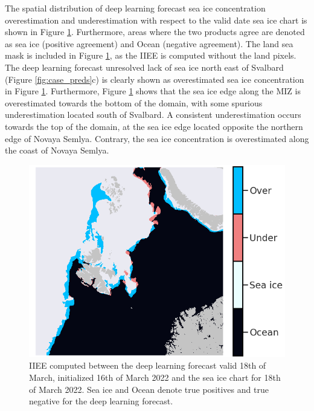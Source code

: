\documentclass[../main/thesis.tex]{subfiles}
\begin{document}
The spatial distribution of deep learning forecast sea ice concentration overestimation and underestimation \citep{Goessling2016} with respect to the valid date sea ice chart is shown in Figure \ref{fig:case_iiee}. Furthermore, areas where the two products agree are denoted as sea ice (positive agreement) and Ocean (negative agreement). The land sea mask is included in Figure \ref{fig:case_iiee}, as the IIEE is computed without the land pixels. The deep learning forecast unresolved lack of sea ice north east of Svalbard (Figure \ref{fig:case_preds}c) is clearly shown as overestimated sea ice concentration in Figure \ref{fig:case_iiee}. Furthermore, Figure \ref{fig:case_iiee} shows that the sea ice edge along the MIZ is overestimated towards the bottom of the domain, with some spurious underestimation located south of Svalbard. A consistent underestimation occurs towards the top of the domain, at the sea ice edge located opposite the northern edge of Novaya Semlya. Contrary, the sea ice concentration is overestimated along the coast of Novaya Semlya.

\begin{figure}
    \centering
    \includegraphics[width=\textwidth]{iiee}
    \caption{\label{fig:case_iiee}IIEE computed between the deep learning forecast valid 18th of March, initialized 16th of March 2022 and the sea ice chart for 18th of March 2022. Sea ice and Ocean denote true positives and true negative for the deep learning forecast.}
\end{figure}




\biblio
\end{document}
